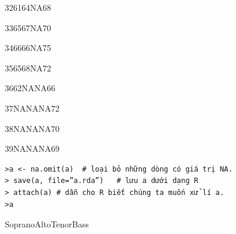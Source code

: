 \documentclass[a4paper]{article}
\begin{document}
32\hspace{1.5cm}61\hspace{1.5cm}64\hspace{1.5cm}NA\hspace{1.5cm}68

33\hspace{1.5cm}65\hspace{1.5cm}67\hspace{1.5cm}NA\hspace{1.5cm}70

34\hspace{1.5cm}66\hspace{1.5cm}66\hspace{1.5cm}NA\hspace{1.5cm}75

35\hspace{1.5cm}65\hspace{1.5cm}68\hspace{1.5cm}NA\hspace{1.5cm}72

36\hspace{1.5cm}62\hspace{1.5cm}NA\hspace{1.5cm}NA\hspace{1.5cm}66

37\hspace{1.5cm}NA\hspace{1.5cm}NA\hspace{1.5cm}NA\hspace{1.5cm}72

38\hspace{1.5cm}NA\hspace{1.5cm}NA\hspace{1.5cm}NA\hspace{1.5cm}70

39\hspace{1.5cm}NA\hspace{1.5cm}NA\hspace{1.5cm}NA\hspace{1.5cm}69

\begin{verbatim}
>a <- na.omit(a)  # loại bỏ những dòng có giá trị NA.
> save(a, file=”a.rda”)   # lưu a dưới dạng R
> attach(a) # dẫn cho R biết chúng ta muốn xử lí a.
>a

\end{verbatim}
\hspace{1.5cm}Soprano\hspace{1.5cm}Alto\hspace{1.5cm}Tenor\hspace{1.5cm}Bass
\end{document}
